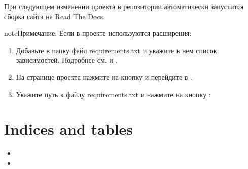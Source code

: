 \documentclass[a4paper,12pt,russian]{sphinxmanual}
\begin{document}
При следующем изменении проекта в репозитории автоматически запустится сборка сайта на Read The Docs.

\begin{sphinxadmonition}{note}{Примечание:}
Если в проекте используются расширения:
\begin{enumerate}
%
\item {} 
Добавьте в папку  файл requirements.txt и укажите в нем список зависимостей. Подробнее см.  и  .

\item {} 
На странице проекта нажмите на кнопку  и перейдите в .

\item {} 
Укажите путь к файлу requirements.txt и нажмите на кнопку :

\end{enumerate}

\end{sphinxadmonition}









\chapter{Indices and tables}
\label{\detokenize{index:indices-and-tables}}\begin{itemize}
\item {} 

\item {} 

\end{itemize}



\renewcommand{\indexname}{Алфавитный указатель}
\printindex
\end{document}
